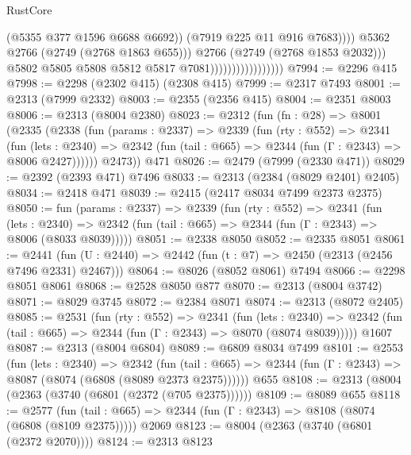 \begin{lexlean}{RustCore}
\begin{coremodule}
                                                  (@5355 @377 @1596 @6688 @6692))
                                                (@7919 @225 @11 @916 @7683))))
                                          @5362
                                          @2766
                                          (@2749 (@2768 @1863 @655)))
                                        @2766
                                        (@2749 (@2768 @1853 @2032)))
                                      @5802
                                      @5805
                                      @5808
                                      @5812
                                      @5817
                                      @7081)))))))))))))))))
@7994 := @2296 @415
@7998 := @2298 (@2302 @415) (@2308 @415)
@7999 := @2317 @7493
@8001 := @2313 (@7999 @2332)
@8003 := @2355 (@2356 @415)
@8004 := @2351 @8003
@8006 := @2313 (@8004 @2380)
@8023 := @2312
    (fun (fn : @28) =>
    @8001
      (@2335
        (@2338
          (fun (params : @2337) =>
          @2339
            (fun (rty : @552) =>
            @2341
              (fun (lets : @2340) =>
              @2342 (fun (tail : @665) => @2344 (fun (Γ : @2343) => @8006 @2427))))))
        @2473))
    @471
@8026 := @2479 (@7999 (@2330 @471))
@8029 := @2392 (@2393 @471) @7496
@8033 := @2313 (@2384 (@8029 @2401) @2405)
@8034 := @2418 @471
@8039 := @2415 (@2417 @8034 @7499 @2373 @2375)
@8050 := fun (params : @2337) =>
  @2339
    (fun (rty : @552) =>
    @2341
      (fun (lets : @2340) =>
      @2342 (fun (tail : @665) => @2344 (fun (Γ : @2343) => @8006 (@8033 @8039)))))
@8051 := @2338 @8050
@8052 := @2335 @8051
@8061 := @2441 (fun (U : @2440) => @2442 (fun (t : @7) => @2450 (@2313 (@2456 @7496 @2331) @2467)))
@8064 := @8026 (@8052 @8061) @7494
@8066 := @2298 @8051 @8061
@8068 := @2528 @8050 @877
@8070 := @2313 (@8004 @3742)
@8071 := @8029 @3745
@8072 := @2384 @8071
@8074 := @2313 (@8072 @2405)
@8085 := @2531
    (fun (rty : @552) =>
    @2341
      (fun (lets : @2340) =>
      @2342 (fun (tail : @665) => @2344 (fun (Γ : @2343) => @8070 (@8074 @8039)))))
    @1607
@8087 := @2313 (@8004 @6804)
@8089 := @6809 @8034 @7499
@8101 := @2553
    (fun (lets : @2340) =>
    @2342
      (fun (tail : @665) => @2344 (fun (Γ : @2343) => @8087 (@8074 (@6808 (@8089 @2373 @2375))))))
    @655
@8108 := @2313 (@8004 (@2363 (@3740 (@6801 (@2372 (@705 @2375))))))
@8109 := @8089 @655
@8118 := @2577
    (fun (tail : @665) => @2344 (fun (Γ : @2343) => @8108 (@8074 (@6808 (@8109 @2375)))))
    @2069
@8123 := @8004 (@2363 (@3740 (@6801 (@2372 @2070))))
@8124 := @2313 @8123

\end{coremodule}
\end{lexlean}

